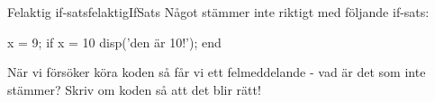 
\begin{matteovning}{Felaktig if-sats}{felaktigIfSats}
Något stämmer inte riktigt med följande if-sats:

\vspace{10pt}
\begin{matlab}
x = 9;
if x = 10
    disp('den är 10!');
end
\end{matlab}

När vi försöker köra koden så får vi ett felmeddelande - vad är det som inte stämmer? Skriv om koden så att det blir rätt!
\end{matteovning}
